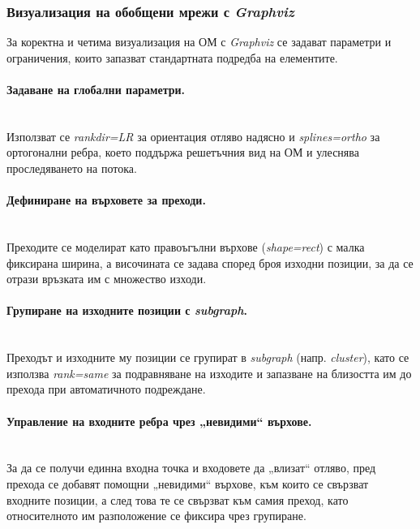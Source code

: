 \subsubsection{Визуализация на обобщени мрежи с \textit{Graphviz}}

\hspace*{2.5em}За коректна и четима визуализация на ОМ с \textit{Graphviz} се задават параметри и ограничения, които запазват стандартната подредба на елементите.

\paragraph{Задаване на глобални параметри.}
\mbox{}\\
Използват се \textit{rankdir=LR} за ориентация отляво надясно и \textit{splines=ortho} за ортогонални ребра, което поддържа решетъчния вид на ОМ и улеснява проследяването на потока.

\paragraph{Дефиниране на върховете за преходи.}
\mbox{}\\
Преходите се моделират като правоъгълни върхове (\textit{shape=rect}) с малка фиксирана ширина, а височината се задава според броя изходни позиции, за да се отрази връзката им с множество изходи.

\paragraph{Групиране на изходните позиции с \textit{subgraph}.}
\mbox{}\\
Преходът и изходните му позиции се групират в \textit{subgraph} (напр. \textit{cluster}), като се използва \textit{rank=same} за подравняване на изходите и запазване на близостта им до прехода при автоматичното подреждане.

\paragraph{Управление на входните ребра чрез „невидими“ върхове.}
\mbox{}\\
За да се получи единна входна точка и входовете да „влизат“ отляво, пред прехода се добавят помощни „невидими“ върхове, към които се свързват входните позиции, а след това те се свързват към самия преход, като относителното им разположение се фиксира чрез групиране.


